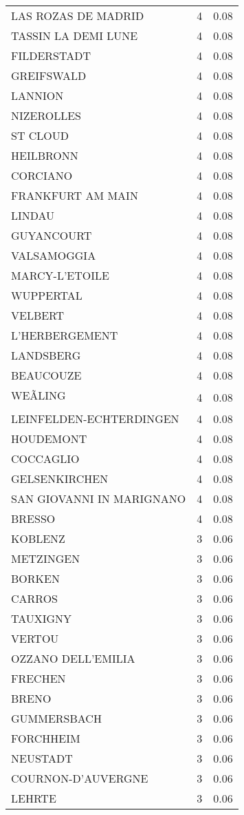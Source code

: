 \begin{table*}[htbp]
\begin{tabular}{lrr}
LAS ROZAS DE MADRID & 4 & 0.08 \\
TASSIN LA DEMI LUNE & 4 & 0.08 \\
FILDERSTADT & 4 & 0.08 \\
GREIFSWALD & 4 & 0.08 \\
LANNION & 4 & 0.08 \\
NIZEROLLES & 4 & 0.08 \\
ST CLOUD & 4 & 0.08 \\
HEILBRONN & 4 & 0.08 \\
CORCIANO & 4 & 0.08 \\
FRANKFURT AM MAIN & 4 & 0.08 \\
LINDAU & 4 & 0.08 \\
GUYANCOURT & 4 & 0.08 \\
VALSAMOGGIA & 4 & 0.08 \\
MARCY-L'ETOILE & 4 & 0.08 \\
WUPPERTAL & 4 & 0.08 \\
VELBERT & 4 & 0.08 \\
L'HERBERGEMENT & 4 & 0.08 \\
LANDSBERG & 4 & 0.08 \\
BEAUCOUZE & 4 & 0.08 \\
WEÃLING & 4 & 0.08 \\
LEINFELDEN-ECHTERDINGEN & 4 & 0.08 \\
HOUDEMONT & 4 & 0.08 \\
COCCAGLIO & 4 & 0.08 \\
GELSENKIRCHEN & 4 & 0.08 \\
SAN GIOVANNI IN MARIGNANO & 4 & 0.08 \\
BRESSO & 4 & 0.08 \\
KOBLENZ & 3 & 0.06 \\
METZINGEN & 3 & 0.06 \\
BORKEN & 3 & 0.06 \\
CARROS & 3 & 0.06 \\
TAUXIGNY & 3 & 0.06 \\
VERTOU & 3 & 0.06 \\
OZZANO DELL'EMILIA & 3 & 0.06 \\
FRECHEN & 3 & 0.06 \\
BRENO & 3 & 0.06 \\
GUMMERSBACH & 3 & 0.06 \\
FORCHHEIM & 3 & 0.06 \\
NEUSTADT & 3 & 0.06 \\
COURNON-D'AUVERGNE & 3 & 0.06 \\
LEHRTE & 3 & 0.06 \\

\end{tabular}
\end{table*}
